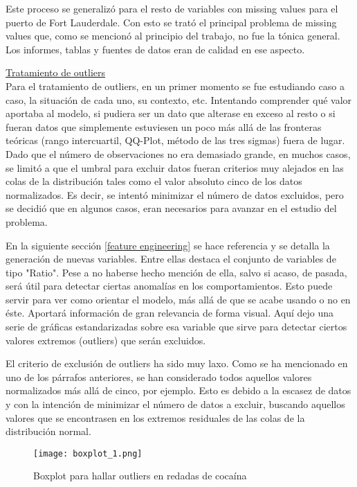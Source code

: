 \documentclass[12pt]{article}
\begin{document}
		Este proceso se generalizó para el resto de variables con missing values para el puerto de Fort Lauderdale. Con esto se trató el principal problema de missing values que, como se mencionó al principio del trabajo, no fue la tónica general. Los informes, tablas y fuentes de datos eran de calidad en ese aspecto.
		
		\underline{Tratamiento de outliers}\\
		Para el tratamiento de outliers, en un primer momento se fue estudiando caso a caso, la situación de cada uno, su contexto, etc. Intentando comprender qué valor aportaba al modelo, si pudiera ser un dato que alterase en exceso al resto o si fueran datos que simplemente estuviesen un poco más allá de las fronteras teóricas (rango intercuartil, QQ-Plot, método de las tres sigmas) fuera de lugar.
		Dado que el número de observaciones no era demasiado grande, en muchos casos, se limitó a que el umbral para excluir datos fueran criterios muy alejados en las colas de la distribución tales como el valor absoluto cinco de los datos normalizados. Es decir, se intentó minimizar el número de datos excluidos, pero se decidió que en algunos casos, eran necesarios para avanzar en el estudio del problema.
		
		En la siguiente sección \ref{feature engineering} se hace referencia y se detalla la generación de nuevas variables. Entre ellas destaca el conjunto de variables de tipo "Ratio". Pese a no haberse hecho mención de ella, salvo si acaso, de pasada, será útil para detectar ciertas anomalías en los comportamientos. Esto puede servir para ver como orientar el modelo, más allá de que se acabe usando o no en éste. Aportará información de gran relevancia de forma visual. Aquí dejo una serie de gráficas estandarizadas sobre esa variable que sirve para detectar ciertos valores extremos (outliers) que serán excluidos.
		
		
		
		El criterio de exclusión de outliers ha sido muy laxo. Como se ha mencionado en uno de los párrafos anteriores, se han considerado todos aquellos valores normalizados más allá de cinco, por ejemplo. Esto es debido a la escasez de datos y con la intención de minimizar el número de datos a excluir, buscando aquellos valores que se encontrasen en los extremos residuales de las colas de la distribución normal.
		
		\begin{figure}[H]
			\caption{\label{boxplot_1} Boxplot para hallar outliers en redadas de cocaína}
			\centering
			\hspace*{1cm}
			\texttt{[image: boxplot\_1.png]}
		\end{figure}
	
\end{document}
